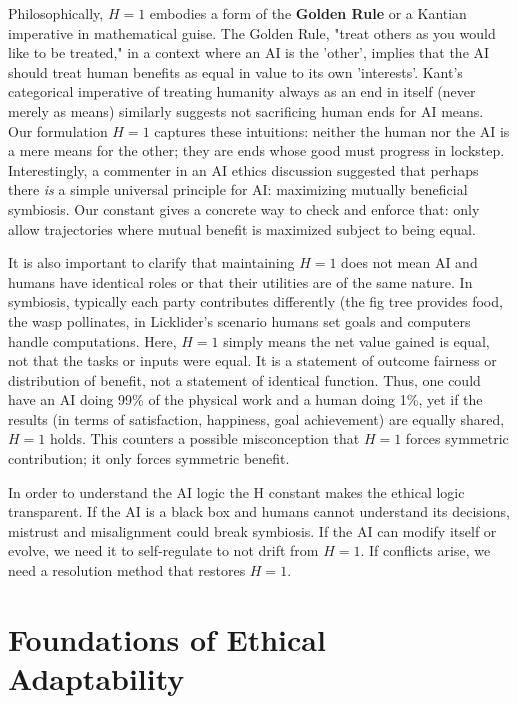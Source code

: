 \documentclass[12pt]{article}
\begin{document}
Philosophically, $H=1$ embodies a form of the \textbf{Golden Rule} or a Kantian imperative in mathematical guise. The Golden Rule, "treat others as you would like to be treated," in a context where an AI is the 'other', implies that the AI should treat human benefits as equal in value to its own 'interests'. Kant’s categorical imperative of treating humanity always as an end in itself (never merely as means) similarly suggests not sacrificing human ends for AI means. Our formulation $H=1$ captures these intuitions: neither the human nor the AI is a mere means for the other; they are ends whose good must progress in lockstep. Interestingly, a commenter in an AI ethics discussion suggested that perhaps there \emph{is} a simple universal principle for AI: maximizing mutually beneficial symbiosis. Our constant gives a concrete way to check and enforce that: only allow trajectories where mutual benefit is maximized subject to being equal.

It is also important to clarify that maintaining $H=1$ does not mean AI and humans have identical roles or that their utilities are of the same nature. In symbiosis, typically each party contributes differently (the fig tree provides food, the wasp pollinates, in Licklider’s scenario humans set goals and computers handle computations. Here, $H=1$ simply means the net value gained is equal, not that the tasks or inputs were equal. It is a statement of outcome fairness or distribution of benefit, not a statement of identical function. Thus, one could have an AI doing 99\% of the physical work and a human doing 1\%, yet if the results (in terms of satisfaction, happiness, goal achievement) are equally shared, $H=1$ holds. This counters a possible misconception that $H=1$ forces symmetric contribution; it only forces symmetric benefit.

In order to understand the AI logic the H constant makes the ethical logic transparent. If the AI is a black box and humans cannot understand its decisions, mistrust and misalignment could break symbiosis. If the AI can modify itself or evolve, we need it to self-regulate to not drift from $H=1$. If conflicts arise, we need a resolution method that restores $H=1$. 

\newpage


\section{Foundations of Ethical Adaptability}
\end{document}
